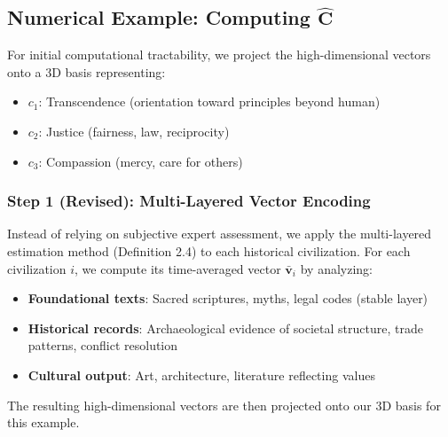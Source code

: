 \documentclass[11pt,a4paper]{article}
\theoremstyle{definition}
\theoremstyle{remark}
\begin{document}
\subsection{Numerical Example: Computing \(\hat{\mathbf{C}}\)}

For initial computational tractability, we project the high-dimensional vectors onto a 3D basis representing:
\begin{itemize}
\item \(c_1\): Transcendence (orientation toward principles beyond human)
\item \(c_2\): Justice (fairness, law, reciprocity)
\item \(c_3\): Compassion (mercy, care for others)
\end{itemize}

\subsubsection{Step 1 (Revised): Multi-Layered Vector Encoding}

Instead of relying on subjective expert assessment, we apply the multi-layered estimation method (Definition 2.4) to each historical civilization. For each civilization \(i\), we compute its time-averaged vector \(\bar{\mathbf{v}}_i\) by analyzing:

\begin{itemize}
    \item \textbf{Foundational texts}: Sacred scriptures, myths, legal codes (stable layer)
    \item \textbf{Historical records}: Archaeological evidence of societal structure, trade patterns, conflict resolution
    \item \textbf{Cultural output}: Art, architecture, literature reflecting values
\end{itemize}

The resulting high-dimensional vectors are then projected onto our 3D basis for this example.
\end{document}
